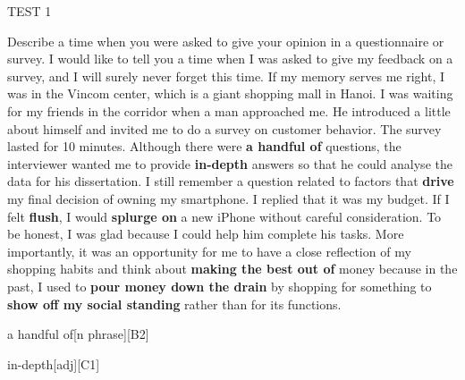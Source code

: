 \begin{glossarymc}[Cambridge 8]
\begin{test}{TEST 1}
\begin{qa}{Describe a time when you were asked to give your opinion in a questionnaire or survey.}
    I would like to tell you a time when I was asked to give my feedback on a survey, and I will surely never forget this time. If my memory serves me right, I was in the Vincom center, which is a giant shopping mall in Hanoi. I was waiting for my friends in the corridor when a man approached me. He introduced a little about himself and invited me to do a survey on customer behavior. The survey lasted for 10 minutes. Although there were \textbf{a handful of} questions, the interviewer wanted me to provide \textbf{in-depth} answers so that he could analyse the data for his dissertation. I still remember a question related to factors that \textbf{drive} my final decision of owning my smartphone. I replied that it was my budget. If I felt \textbf{flush}, I would \textbf{splurge on} a new iPhone without careful consideration. To be honest, I was glad because I could help him complete his tasks. More importantly, it was an opportunity for me to have a close reflection of my shopping habits and think about \textbf{making the best out of} money because in the past, I used to \textbf{pour money down the drain} by shopping for something to \textbf{show off my social standing} rather than for its functions.
    \end{qa}

        \begin{VocabExplain}[Part 2]
            \begin{ExplainCard}{a handful of}[n phrase][B2]
            \end{ExplainCard}

            \begin{ExplainCard}{in-depth}[adj][C1]
            \end{ExplainCard}


\end{VocabExplain}
\end{test}
\end{glossarymc}

